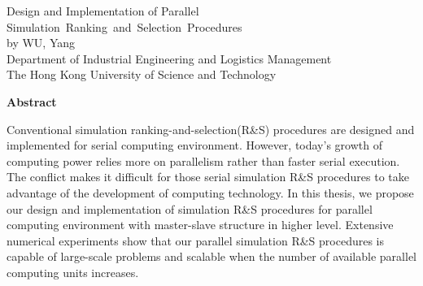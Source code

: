 \begin{center}
{\Large Design and Implementation of Parallel Simulation~Ranking~and~Selection~Procedures}\\
\vspace{20mm}
by WU, Yang\\
Department of Industrial Engineering and Logistics Management\\
The Hong Kong University of Science and Technology
\end{center}
\vspace{8mm}
\begin{center}
\textbf{Abstract}
\end{center}
\par
\noindent

Conventional simulation ranking-and-selection(R\&S) procedures are designed and implemented for serial computing environment. However, today's growth of computing power relies more on parallelism rather than faster serial execution. The conflict makes it difficult for those serial simulation R\&S procedures to take advantage of the development of computing technology. In this thesis, we propose our design and implementation of simulation R\&S procedures for parallel computing environment with master-slave structure in higher level. Extensive numerical experiments show that our parallel simulation R\&S procedures is capable of large-scale problems and scalable when the number of available parallel computing units increases.
